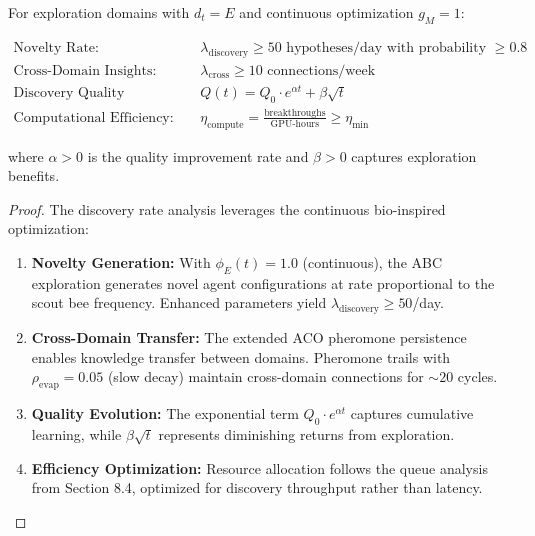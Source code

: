\documentclass{article}
\begin{document}
\begin{theorem}
\label{thm:exploration_discovery_extended}
For exploration domains with $d_t = E$ and continuous optimization $g_M = 1$:

\begin{align}
\text{Novelty Rate:} \quad &\lambda_{\text{discovery}} \geq 50 \text{ hypotheses/day with probability } \geq 0.8 \\
\text{Cross-Domain Insights:} \quad &\lambda_{\text{cross}} \geq 10 \text{ connections/week} \\
\text{Discovery Quality Evolution:} \quad &Q(t) = Q_0 \cdot e^{\alpha t} + \beta \sqrt{t} \\
\text{Computational Efficiency:} \quad &\eta_{\text{compute}} = \frac{\text{breakthroughs}}{\text{GPU-hours}} \geq \eta_{\min}
\end{align}

where $\alpha > 0$ is the quality improvement rate and $\beta > 0$ captures exploration benefits.
\end{theorem}

\begin{proof}
The discovery rate analysis leverages the continuous bio-inspired optimization:

\begin{enumerate}
\item \textbf{Novelty Generation:} With $\phi_E(t) = 1.0$ (continuous), the ABC exploration generates novel agent configurations at rate proportional to the scout bee frequency. Enhanced parameters yield $\lambda_{\text{discovery}} \geq 50$/day.

\item \textbf{Cross-Domain Transfer:} The extended ACO pheromone persistence enables knowledge transfer between domains. Pheromone trails with $\rho_{\text{evap}} = 0.05$ (slow decay) maintain cross-domain connections for $\sim 20$ cycles.

\item \textbf{Quality Evolution:} The exponential term $Q_0 \cdot e^{\alpha t}$ captures cumulative learning, while $\beta \sqrt{t}$ represents diminishing returns from exploration.

\item \textbf{Efficiency Optimization:} Resource allocation follows the queue analysis from Section 8.4, optimized for discovery throughput rather than latency.
\end{enumerate}
\end{proof}
\end{document}
